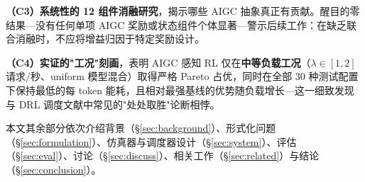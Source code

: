 \noindent\textbf{（C3）系统性的 12 组件消融研究}，揭示哪些 AIGC 抽象真正有贡献。醒目的零结果---没有任何单项 AIGC 奖励或状态组件个体显著---警示后续工作：在缺乏联合消融时，不应将增益归因于特定奖励设计。

\noindent\textbf{（C4）实证的"工况"刻画}，表明 AIGC 感知 RL 仅在\textbf{中等负载工况}（$\lambda \in [1, 2]$ 请求/秒、uniform 模型混合）取得严格 Pareto 占优，同时在全部 30 种测试配置下保持最低的每 token 能耗，且相对最强基线的优势随负载增长---这一细致发现与 DRL 调度文献中常见的"处处取胜"论断相悖。

\smallskip
本文其余部分依次介绍背景（\S\ref{sec:background}）、形式化问题（\S\ref{sec:formulation}）、仿真器与调度器设计（\S\ref{sec:system}）、评估（\S\ref{sec:eval}）、讨论（\S\ref{sec:discuss}）、相关工作（\S\ref{sec:related}）与结论（\S\ref{sec:conclusion}）。
